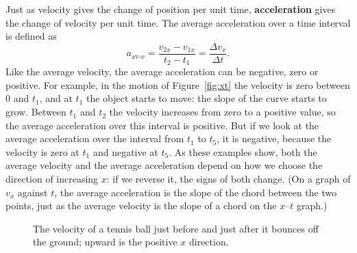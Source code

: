 \documentclass[11pt,a4paper]{article}
\newcommand{\aavx}{a_{\mathrm{av}\text{-}x}}   %
\begin{document}
Just as velocity gives the change of position per unit time, \textbf{acceleration} gives the change
of velocity per unit time. The average acceleration over a time interval is defined as
\begin{equation}\label{eq:aav}
  \aavx = \frac{v_{2x} - v_{1x}}{t_2 - t_1} = \frac{\Delta v_x}{\Delta t} .
\end{equation}
Like the average velocity, the average acceleration can be negative, zero or positive. For
example, in the motion of Figure~\ref{fig:xt} the velocity is zero between $0$ and $t_1$, and at
$t_1$ the object starts to move: the slope of the curve starts to grow. Between $t_1$ and $t_2$
the velocity increases from zero to a positive value, so the average acceleration over this
interval is positive. But if we look at the average acceleration over the interval
from $t_1$ to $t_5$, it is negative, because the velocity is zero at $t_1$ and negative at $t_5$.
As these examples show, both the average velocity and the average acceleration depend on how we
choose the direction of increasing $x$: if we reverse it, the signs of both change. (On a graph of
$v_x$ against $t$, the average acceleration is the slope of the chord between the two points, just
as the average velocity is the slope of a chord on the $x$--$t$ graph.)

\begin{figure}[ht]
\centering
\begin{minipage}[c]{0.46\textwidth}
\centering
{}
\end{minipage}\hfill
\begin{minipage}[c]{0.44\textwidth}
\caption{The velocity of a tennis ball just before and just after it bounces off the ground;
upward is the positive $x$ direction.}\label{fig:bounce}
\end{minipage}
\end{figure}
\end{document}
